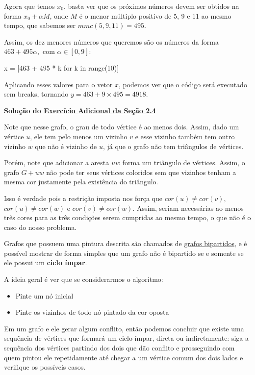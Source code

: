 \documentclass[11pt, a4paper]{article}
\begin{document}
Agora que temos \(x_0\), basta ver que os próximos números devem ser obtidos na forma \(x_0+\alpha M\), onde \(M\) é o menor múltiplo positivo de 5, 9 e 11 ao mesmo tempo, que sabemos ser \(mmc(5,9,11)=495\).

Assim, os dez menores números que queremos são os números da forma \(463+495\alpha, \) com \(\alpha \in [0,9]\):

\begin{code}
x = [463 + 495 * k for k in range(10)]
\end{code}

\void[-1]

Aplicando esses valores para o vetor \(x\), podemos ver que o código será executado sem breaks, tornando \(y=463+9\times495=4918\).

\newpage

\label{sol_ex2.4.a}
\textbf{Solução do \hyperref[ex2.4.a]{Exercício Adicional da Seção 2.4}}

Note que nesse grafo, o grau de todo vértice é ao menos dois. Assim, dado um vértice \(u\), ele tem pelo menos um vizinho \(v\) e esse vizinho também tem outro vizinho \(w\) que não é vizinho de \(u\), já que o grafo não tem triângulos de vértices.

Porém, note que adicionar a aresta \(uw\) forma um triângulo de vértices. Assim, o grafo \(G+uw\) não pode ter seus vértices coloridos sem que vizinhos tenham a mesma cor justamente pela existência do triângulo.

Isso é verdade pois a restrição imposta nos força que \(cor(u) \ne cor(v)\), \(cor(u) \ne cor(w)\) e \(cor(v) \ne cor(w)\). Assim, seriam necessárias ao menos três cores para as três condições serem cumpridas ao mesmo tempo, o que não é o caso do nosso problema.

Grafos que possuem uma pintura descrita são chamados de \href{https://en.wikipedia.org/wiki/Bipartite_graph}{grafos bipartidos}, e é possível mostrar de forma simples que um grafo não é bipartido se e somente se ele possui um \textbf{ciclo ímpar}.

A ideia geral é ver que se considerarmos o algoritmo:

\begin{itemize}
    \item Pinte um nó inicial
    \item Pinte os vizinhos de todo nó pintado da cor oposta
\end{itemize}

Em um grafo e ele gerar algum conflito, então podemos concluir que existe uma sequência de vértices que formará um ciclo ímpar, direta ou indiretamente: siga a sequência dos vértices partindo dos dois que dão conflito e prosseguindo com quem pintou ele repetidamente até chegar a um vértice comum dos dois lados e verifique os possíveis casos.
\end{document}
